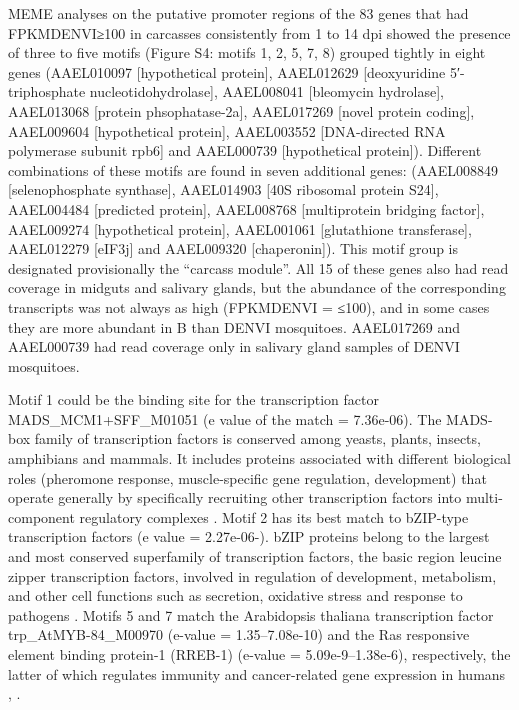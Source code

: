 MEME analyses on the putative promoter regions of the 83 genes that had FPKMDENVI≥100 in carcasses consistently from 1 to 14 dpi showed the presence of three to five motifs (Figure S4: motifs 1, 2, 5, 7, 8) grouped tightly in eight genes (AAEL010097 [hypothetical protein], AAEL012629 [deoxyuridine 5′-triphosphate nucleotidohydrolase], AAEL008041 [bleomycin hydrolase], AAEL013068 [protein phsophatase-2a], AAEL017269 [novel protein coding], AAEL009604 [hypothetical protein], AAEL003552 [DNA-directed RNA polymerase subunit rpb6] and AAEL000739 [hypothetical protein]).
Different combinations of these motifs are found in seven additional genes: (AAEL008849 [selenophosphate synthase], AAEL014903 [40S ribosomal protein S24], AAEL004484 [predicted protein], AAEL008768 [multiprotein bridging factor], AAEL009274 [hypothetical protein], AAEL001061 [glutathione transferase], AAEL012279 [eIF3j] and AAEL009320 [chaperonin]).
This motif group is designated provisionally the “carcass module”.
All 15 of these genes also had read coverage in midguts and salivary glands, but the abundance of the corresponding transcripts was not always as high (FPKMDENVI = ≤100), and in some cases they are more abundant in B than DENVI mosquitoes.
AAEL017269 and AAEL000739 had read coverage only in salivary gland samples of DENVI mosquitoes.

Motif 1 could be the binding site for the transcription factor MADS\_MCM1+SFF\_M01051 (e value of the match = 7.36e-06).
The MADS-box family of transcription factors is conserved among yeasts, plants, insects, amphibians and mammals.
It includes proteins associated with different biological roles (pheromone response, muscle-specific gene regulation, development) that operate generally by specifically recruiting other transcription factors into multi-component regulatory complexes \cite{Shore1995}.
Motif 2 has its best match to bZIP-type transcription factors (e value = 2.27e-06-).
bZIP proteins belong to the largest and most conserved superfamily of transcription factors, the basic region leucine zipper transcription factors, involved in regulation of development, metabolism, and other cell functions such as secretion, oxidative stress and response to pathogens \cite{Miller2009}\cite{Abrams2005}\cite{Guo2010a}.
Motifs 5 and 7 match the Arabidopsis thaliana transcription factor trp\_AtMYB-84\_M00970 (e-value = 1.35–7.08e-10) and the Ras responsive element binding protein-1 (RREB-1) (e-value = 5.09e-9–1.38e-6), respectively, the latter of which regulates immunity and cancer-related gene expression in humans \cite{Flajollet2009}, \cite{Liu2009}.

